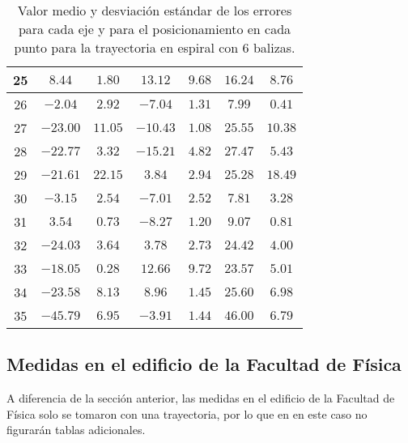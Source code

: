 \begin{table}[H]
\begin{tabular}{|c|c|c|c|c|c|c|}
                        25  &   $8.44$     &  $1.80$   &  $13.12$   &   $9.68$   &  $16.24$  &  $8.76$  \\ \hline
                        26  &   $-2.04$    &  $2.92$   &  $-7.04$   &   $1.31$   &  $7.99$   &  $0.41$  \\ \hline
                        27  &   $-23.00$   &  $11.05$  &  $-10.43$  &   $1.08$   &  $25.55$  &  $10.38$ \\ \hline
                        28  &   $-22.77$   &  $3.32$   &  $-15.21$  &   $4.82$   &  $27.47$  &  $5.43$  \\ \hline
                        29  &   $-21.61$   &  $22.15$  &  $3.84$    &   $2.94$   &  $25.28$  &  $18.49$ \\ \hline
                        30  &   $-3.15$    &  $2.54$   &  $-7.01$   &   $2.52$   &  $7.81$   &  $3.28$  \\ \hline
                        31  &   $3.54$     &  $0.73$   &  $-8.27$   &   $1.20$   &  $9.07$   &  $0.81$  \\ \hline
                        32  &   $-24.03$   &  $3.64$   &  $3.78$    &   $2.73$   &  $24.42$  &  $4.00$  \\ \hline
                        33  &   $-18.05$   &  $0.28$   &  $12.66$   &   $9.72$   &  $23.57$  &  $5.01$  \\ \hline
                        34  &   $-23.58$   &  $8.13$   &  $8.96$    &   $1.45$   &  $25.60$  &  $6.98$  \\ \hline
                        35  &   $-45.79$   &  $6.95$   &  $-3.91$   &   $1.44$   &  $46.00$  &  $6.79$  \\ \hline
        \end{tabular}
    \caption{Valor medio y desviación estándar de los errores para cada eje y para el posicionamiento en cada punto para la trayectoria en espiral con 6 balizas.}
    \label{tab:media_lab_6_espiral}
\end{table}

\newpage
\subsection{Medidas en el edificio de la Facultad de Física}
A diferencia de la sección anterior, las medidas en el edificio de la Facultad de Física solo se tomaron con una trayectoria, por lo que en en este caso no figurarán tablas adicionales.

